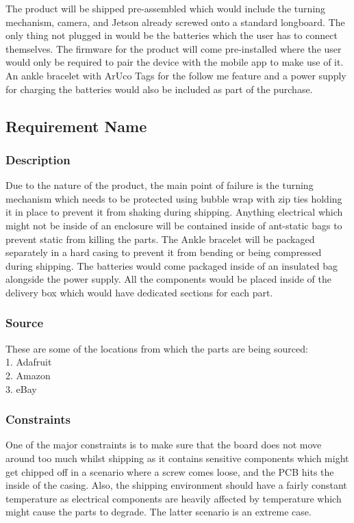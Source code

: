 The product will be shipped pre-assembled which would include the turning mechanism, camera, and Jetson already screwed onto a standard longboard. The only thing not plugged in would be the batteries which the user has to connect themselves. The firmware for the product will come pre-installed where the user would only be required to pair the device with the mobile app to make use of it. An ankle bracelet with ArUco Tags for the follow me feature and a power supply for charging the batteries would also be included as part of the purchase.

\subsection{Requirement Name}
\subsubsection{Description}
Due to the nature of the product, the main point of failure is the turning mechanism which needs to be protected using bubble wrap with zip ties holding it in place to prevent it from shaking during shipping. Anything electrical which might not be inside of an enclosure will be contained inside of ant-static bags to prevent static from killing the parts. The Ankle bracelet will be packaged separately in a hard casing to prevent it from bending or being compressed during shipping. The batteries would come packaged inside of an insulated bag alongside the power supply. All the components would be placed inside of the delivery box which would have dedicated sections for each part.
\subsubsection{Source}
These are some of the locations from which the parts are being sourced:\\
1. Adafruit\\
2. Amazon\\
3. eBay
\subsubsection{Constraints}
One of the major constraints is to make sure that the board does not move around too much whilst shipping as it contains sensitive components which might get chipped off in a scenario where a screw comes loose, and the PCB hits the inside of the casing. Also, the shipping environment should have a fairly constant temperature as electrical components are heavily affected by temperature which might cause the parts to degrade. The latter scenario is an extreme case.
